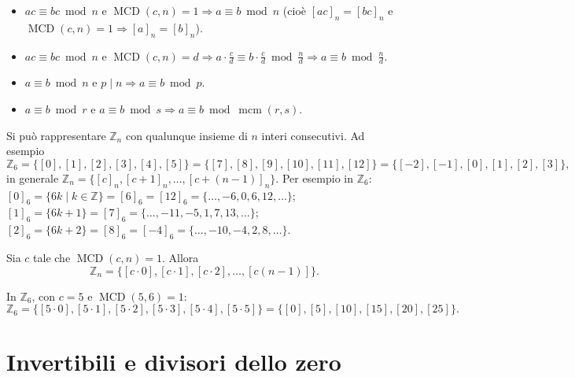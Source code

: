 \documentclass[11pt,a4paper]{article}
\begin{document}
\begin{proprieta}
\begin{itemize}
  \item $ac \equiv bc \bmod n$ e $\operatorname{MCD}(c, n) = 1 \Rightarrow a \equiv b \bmod n$ (cioè $[ac]_n = [bc]_n$ e $\operatorname{MCD}(c, n) = 1 \Rightarrow [a]_n = [b]_n$).
  \item $ac \equiv bc \bmod n$ e $\operatorname{MCD}(c, n) = d \Rightarrow a\cdot\frac{c}{d} \equiv b\cdot\frac{c}{d} \bmod \frac{n}{d} \Rightarrow a \equiv b \bmod \frac{n}{d}$.
  \item $a \equiv b \bmod n$ e $p \mid n \Rightarrow a \equiv b \bmod p$.
  \item $a \equiv b \bmod r$ e $a \equiv b \bmod s \Rightarrow a \equiv b \bmod \operatorname{mcm}(r, s)$.
\end{itemize}
\end{proprieta}

\begin{osservazione}
Si può rappresentare $\mathbb{Z}_n$ con qualunque insieme di $n$ interi consecutivi. Ad esempio
\[
  \mathbb{Z}_6 = \{[0], [1], [2], [3], [4], [5]\} = \{[7], [8], [9], [10], [11], [12]\} = \{[-2], [-1], [0], [1], [2], [3]\},
\]
in generale $\mathbb{Z}_n = \{[c]_n, [c + 1]_n, \dots, [c + (n-1)]_n\}$. Per esempio in $\mathbb{Z}_6$: $[0]_6 = \{6k \mid k \in \mathbb{Z}\} = [6]_6 = [12]_6 = \{\dots, -6, 0, 6, 12, \dots\}$; $[1]_6 = \{6k + 1\} = [7]_6 = \{\dots, -11, -5, 1, 7, 13, \dots\}$; $[2]_6 = \{6k + 2\} = [8]_6 = [-4]_6 = \{\dots, -10, -4, 2, 8, \dots\}$.
\end{osservazione}

\begin{proposizione}
Sia $c$ tale che $\operatorname{MCD}(c, n) = 1$. Allora
\[
  \mathbb{Z}_n = \{[c\cdot 0], [c\cdot 1], [c\cdot 2], \dots, [c(n-1)]\} .
\]
\end{proposizione}

\begin{esempio}
In $\mathbb{Z}_6$, con $c = 5$ e $\operatorname{MCD}(5, 6) = 1$:
\[
  \mathbb{Z}_6 = \{[5\cdot 0], [5\cdot 1], [5\cdot 2], [5\cdot 3], [5\cdot 4], [5\cdot 5]\} = \{[0], [5], [10], [15], [20], [25]\}.
\]
\end{esempio}

\section{Invertibili e divisori dello zero}
\end{document}
